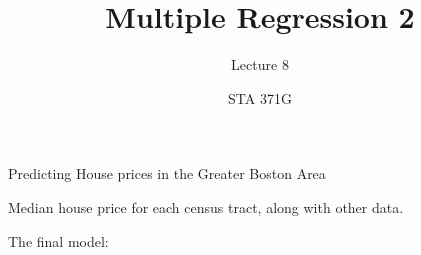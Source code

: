 \documentclass{beamer}\usepackage[]{graphicx}\usepackage[]{color}
\title{Multiple Regression 2}
\subtitle{Lecture 8}
\author{STA 371G}
\begin{document}
  
  
  

  \frame{\maketitle}



  \begin{darkframes}
  
  
    \begin{frame}[fragile]{Predicting House prices in the Greater Boston Area}
      \fontsize{9}{9}\selectfont
      
      Median house price for each census tract, along with other data. \pause
      
      The final model:
      

\end{frame}
\end{darkframes}
\end{document}
